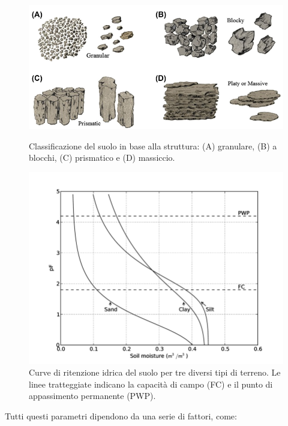 \documentclass[12pt,a4paper,openright,twoside]{book}
\begin{document}
\begin{figure}[!tbp]
    \centering
    \begin{minipage}[t]{0.5\textwidth}
        \includegraphics[width=\linewidth]{../figures/soil-structure.png}
        \caption{Classificazione del suolo in base alla struttura: (A) granulare, (B) a blocchi, (C) prismatico e (D) massiccio\cite{RAI2017505}.}
        \label{fig.soil-structure}
    \end{minipage}
    \hfill
    \begin{minipage}[t]{0.4\textwidth}
        \includegraphics[width=\linewidth]{../figures/SWRC-In-different-soils.png}
        \caption{Curve di ritenzione idrica del suolo per tre diversi tipi di terreno. Le linee tratteggiate indicano la capacità di campo (FC) e il punto di appassimento permanente (PWP)\cite{Fuchsberger1023}.}
        \label{fig.SWRC-In-different-soils}
    \end{minipage}
\end{figure}
Tutti questi parametri dipendono da una serie di fattori, come:
\end{document}
